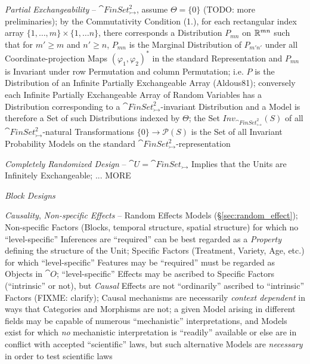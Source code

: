 \emph{Partial Exchangeability} -- $\cat{FinSet}_\rightarrowtail^2$, assume
$\Theta = \{0\}$ (TODO: more preliminaries); by the Commutativity Condition
(1.), for each rectangular index array
$\{1, \ldots, m\} \times \{1, \ldots n\}$, there corresponds a Distribution
$P_{mn}$ on $\mathbb{R}^{mn}$ such that for $m' \geq m$ and $n' \geq n$, $P_{mn}$ is
the Marginal Distribution of $P_{m'n'}$ under all Coordinate-projection Maps
$(\varphi_1, \varphi_2)^*$ in the standard Representation and $P_{mn}$ is
Invariant under row Permutation and column Permutation; i.e. $P$ is the
Distribution of an Infinite Partially Exchangeable Array (Aldous81); conversely
each Infinite Partially Exchangeable Array of Random Variables has a
Distribution corresponding to a $\cat{FinSet}_\rightarrowtail^2$-invariant
Distribution and a Model is therefore a Set of such Distributions indexed by
$\Theta$; the Set $Inv_{\cat{FinSet}_\rightarrowtail^2}(S)$ of all
$\cat{FinSet}_\rightarrowtail^2$-natural Transformations
$\{0\} \to \mathcal{P}(S)$ is the Set of all Invariant Probability Models on the
standard $\cat{FinSet}_\rightarrowtail^2$-representation

\emph{Completely Randomized Design} -- $\cat{U} = \cat{FinSet}_\rightarrowtail$
Implies that the Units are Infinitely Exchangeable; ... MORE

\emph{Block Designs}

\emph{Causality}, \emph{Non-specific Effects} -- Random Effects Models
(\S\ref{sec:random_effect}); Non-specific Factors (Blocks, temporal structure,
spatial structure) for which no ``level-specific'' Inferences are ``required''
can be best regarded as a \emph{Property} defining the structure of the Unit;
Specific Factors (Treatment, Variety, Age, etc.) for which ``level-specific''
Features may be ``required'' must be regarded as Objects in $\cat{O}$;
``level-specific'' Effects may be ascribed to Specific Factors (``intrinsic'' or
not), but \emph{Causal} Effects are not ``ordinarily'' ascribed to ``intrinsic''
Factors (FIXME: clarify);
Causal mechanisms are necessarily \emph{context dependent} in ways that
Categories and Morphisms are not;
a given Model arising in different fields may be capable of numerous
``mechanistic'' interpretations, and Models exist for which \emph{no}
mechanistic interpretation is ``readily'' available or else are in conflict
with accepted ``scientific'' laws, but such alternative Models are
\emph{necessary} in order to test scientific laws

